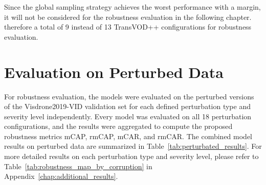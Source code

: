 \documentclass[final,twoside]{vutinfth}
\begin{document}
Since the global sampling strategy achieves the worst performance with a margin, it will not be considered for the robustness evaluation in the following chapter.
therefore a total of 9 instead of 13 TransVOD++ configurations for robustness evaluation.



\section{Evaluation on Perturbed Data}
For robustness evaluation, the models were evaluated on the perturbed versions of the Visdrone2019-VID validation set for each defined perturbation type and severity level independently.
Every model was evaluated on all 18 perturbation configurations, and the results were aggregated to compute the proposed robustness metrics mCAP, rmCAP, mCAR, and rmCAR.\@
The combined model results on perturbed data are summarized in Table~\ref{tab:perturbated_results}.
For more detailed results on each perturbation type and severity level, please refer to Table~\ref{tab:robustness_map_by_corruption} in Appendix~\ref{chap:additional_results}.
\end{document}
